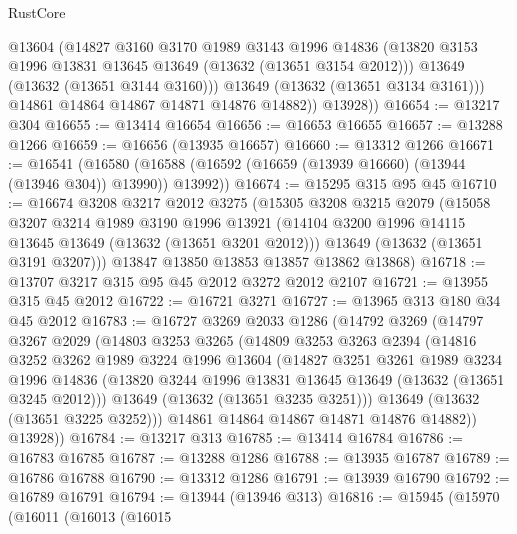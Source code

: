 \begin{lexlean}{RustCore}
\begin{coremodule}
              @13604
              (@14827
                @3160
                @3170
                @1989
                @3143
                @1996
                @14836
                (@13820 @3153 @1996 @13831 @13645 @13649 (@13632 (@13651 @3154 @2012)))
                @13649
                (@13632 (@13651 @3144 @3160)))
              @13649
              (@13632 (@13651 @3134 @3161)))
            @14861
            @14864
            @14867
            @14871
            @14876
            @14882))
        @13928))
@16654 := @13217 @304
@16655 := @13414 @16654
@16656 := @16653 @16655
@16657 := @13288 @1266
@16659 := @16656 (@13935 @16657)
@16660 := @13312 @1266
@16671 := @16541
    (@16580 (@16588 (@16592 (@16659 (@13939 @16660) (@13944 (@13946 @304)) @13990)) @13992))
@16674 := @15295 @315 @95 @45
@16710 := @16674
    @3208
    @3217
    @2012
    @3275
    (@15305
      @3208
      @3215
      @2079
      (@15058
        @3207
        @3214
        @1989
        @3190
        @1996
        @13921
        (@14104 @3200 @1996 @14115 @13645 @13649 (@13632 (@13651 @3201 @2012)))
        @13649
        (@13632 (@13651 @3191 @3207)))
      @13847
      @13850
      @13853
      @13857
      @13862
      @13868)
@16718 := @13707 @3217 @315 @95 @45 @2012 @3272 @2012 @2107
@16721 := @13955 @315 @45 @2012
@16722 := @16721 @3271
@16727 := @13965 @313 @180 @34 @45 @2012
@16783 := @16727
    @3269
    @2033
    @1286
    (@14792
      @3269
      (@14797
        @3267
        @2029
        (@14803
          @3253
          @3265
          (@14809
            @3253
            @3263
            @2394
            (@14816
              @3252
              @3262
              @1989
              @3224
              @1996
              @13604
              (@14827
                @3251
                @3261
                @1989
                @3234
                @1996
                @14836
                (@13820 @3244 @1996 @13831 @13645 @13649 (@13632 (@13651 @3245 @2012)))
                @13649
                (@13632 (@13651 @3235 @3251)))
              @13649
              (@13632 (@13651 @3225 @3252)))
            @14861
            @14864
            @14867
            @14871
            @14876
            @14882))
        @13928))
@16784 := @13217 @313
@16785 := @13414 @16784
@16786 := @16783 @16785
@16787 := @13288 @1286
@16788 := @13935 @16787
@16789 := @16786 @16788
@16790 := @13312 @1286
@16791 := @13939 @16790
@16792 := @16789 @16791
@16794 := @13944 (@13946 @313)
@16816 := @15945
    (@15970
      (@16011
        (@16013
          (@16015

\end{coremodule}
\end{lexlean}
